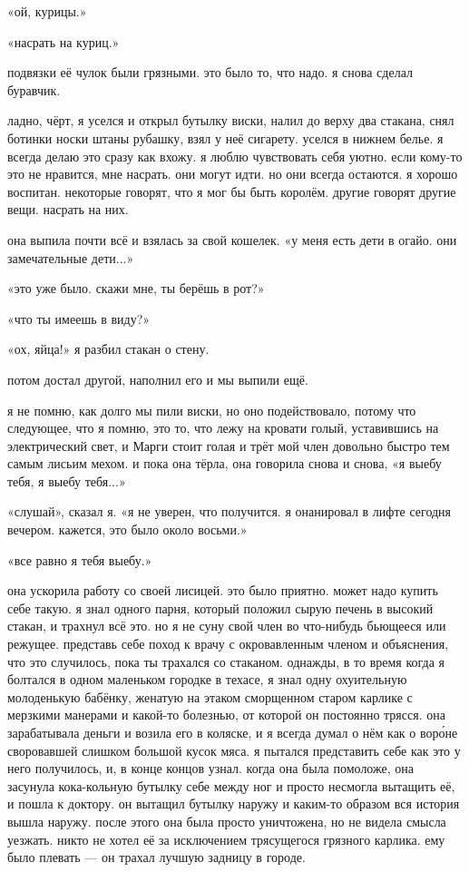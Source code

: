 «ой, курицы.»

«насрать на куриц.»

подвязки её чулок были грязными.
это было то, что надо.
я снова сделал 
буравчик.

ладно, чёрт, я уселся и открыл бутылку виски, налил до верху два стакана,
снял ботинки носки штаны рубашку, взял у неё сигарету.
уселся в нижнем белье.
я всегда делаю это сразу как вхожу.
я люблю чувствовать себя уютно.
если 
кому-то это не нравится, мне насрать.
они могут идти.
но они всегда 
остаются.
я хорошо воспитан.
некоторые говорят, что я мог бы быть королём.
другие говорят другие вещи.
насрать на них.

она выпила почти всё и взялась за свой кошелек.
«у меня есть дети в огайо.
они замечательные дети...»

«это уже было.
скажи мне, ты берёшь в рот?»

«что ты имеешь в виду?»

«ох, яйца!»  я разбил стакан о стену.

потом достал другой, наполнил его и мы выпили ещё.

я не помню, как долго мы пили виски, но оно подействовало,
потому что следующее, что я помню, это то, что лежу на кровати голый,
уставившись на электрический свет, и Марги стоит голая и трёт мой член довольно
быстро тем самым лисьим мехом.
и пока она тёрла, она говорила снова и снова, «я
выебу тебя, я выебу тебя...»

«слушай»,  сказал я.
«я не уверен, что получится.
я онанировал в лифте
сегодня вечером.
кажется, это было около восьми.»

«все равно я тебя выебу.»

она ускорила работу со своей лисицей.
это было приятно.
может надо купить 
себе такую.
я знал одного парня, который положил сырую печень в высокий стакан,
и трахнул всё это.
но я не суну свой член во что-нибудь бьющееся или режущее.
представь себе поход к врачу с окровавленным членом и объяснения, что это случилось, пока ты трахался со стаканом.
однажды, в то время когда я болтался в одном маленьком городке в техасе, я знал одну охуительную  молоденькую бабёнку, женатую на этаком сморщенном старом карлике с мерзкими манерами и какой-то болезнью, от которой он постоянно трясся.
она зарабатывала деньги и возила его в коляске, и я всегда думал о нём как о вор\'{о}не своровавшей слишком большой кусок мяса.
я пытался представить себе как это у него получилось, и, в конце концов узнал.
когда она была помоложе, она засунула кока-кольную бутылку себе между ног и просто несмогла вытащить её, и пошла к доктору.
он вытащил бутылку наружу и каким-то образом вся история вышла наружу.
после этого она была просто уничтожена, но не видела смысла уезжать.
никто не хотел её за исключением трясущегося грязного карлика.
ему было плевать --- он трахал лучшую задницу в городе.

